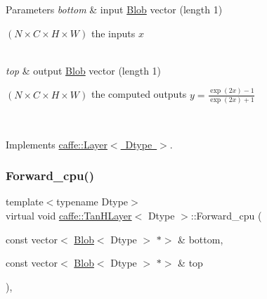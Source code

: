 \begin{DoxyParams}{Parameters}
{\em bottom} & input \mbox{\hyperlink{classcaffe_1_1_blob}{Blob}} vector (length 1)
\begin{DoxyEnumerate}
\item $ (N \times C \times H \times W) $ the inputs $ x $ 
\end{DoxyEnumerate}\\
\hline
{\em top} & output \mbox{\hyperlink{classcaffe_1_1_blob}{Blob}} vector (length 1)
\begin{DoxyEnumerate}
\item $ (N \times C \times H \times W) $ the computed outputs $ y = \frac{\exp(2x) - 1}{\exp(2x) + 1} $ 
\end{DoxyEnumerate}\\
\hline
\end{DoxyParams}


Implements \mbox{\hyperlink{classcaffe_1_1_layer_a576ac6a60b1e99fe383831f52a6cea77}{caffe\+::\+Layer$<$ Dtype $>$}}.

\mbox{\label{classcaffe_1_1_tan_h_layer_aedcd7c93d2733fc1a7f7f5bf85ac4a6d}} 
\subsubsection{\texorpdfstring{Forward\+\_\+cpu()}{Forward\_cpu()}\hspace{0.1cm}{\footnotesize\ttfamily [2/2]}}
{\footnotesize\ttfamily template$<$typename Dtype$>$ \\
virtual void \mbox{\hyperlink{classcaffe_1_1_tan_h_layer}{caffe\+::\+Tan\+H\+Layer}}$<$ Dtype $>$\+::Forward\+\_\+cpu (\begin{DoxyParamCaption}\item[{const vector$<$ \mbox{\hyperlink{classcaffe_1_1_blob}{Blob}}$<$ Dtype $>$ $\ast$$>$ \&}]{bottom,  }\item[{const vector$<$ \mbox{\hyperlink{classcaffe_1_1_blob}{Blob}}$<$ Dtype $>$ $\ast$$>$ \&}]{top }\end{DoxyParamCaption})\hspace{0.3cm}{\ttfamily [protected]}, {\ttfamily [virtual]}}


